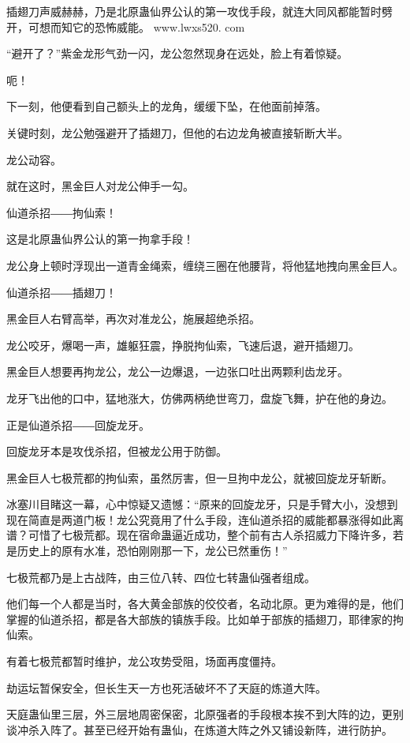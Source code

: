 
\begin{this_body}

插翅刀声威赫赫，乃是北原蛊仙界公认的第一攻伐手段，就连大同风都能暂时劈开，可想而知它的恐怖威能。 www.lwxs520. com

“避开了？”紫金龙形气劲一闪，龙公忽然现身在远处，脸上有着惊疑。

呃！

下一刻，他便看到自己额头上的龙角，缓缓下坠，在他面前掉落。

关键时刻，龙公勉强避开了插翅刀，但他的右边龙角被直接斩断大半。

龙公动容。

就在这时，黑金巨人对龙公伸手一勾。

仙道杀招――拘仙索！

这是北原蛊仙界公认的第一拘拿手段！

龙公身上顿时浮现出一道青金绳索，缠绕三圈在他腰背，将他猛地拽向黑金巨人。

仙道杀招――插翅刀！

黑金巨人右臂高举，再次对准龙公，施展超绝杀招。

龙公咬牙，爆喝一声，雄躯狂震，挣脱拘仙索，飞速后退，避开插翅刀。

黑金巨人想要再拘龙公，龙公一边爆退，一边张口吐出两颗利齿龙牙。

龙牙飞出他的口中，猛地涨大，仿佛两柄绝世弯刀，盘旋飞舞，护在他的身边。

正是仙道杀招――回旋龙牙。

回旋龙牙本是攻伐杀招，但被龙公用于防御。

黑金巨人七极荒都的拘仙索，虽然厉害，但一旦拘中龙公，就被回旋龙牙斩断。

冰塞川目睹这一幕，心中惊疑又遗憾：“原来的回旋龙牙，只是手臂大小，没想到现在简直是两道门板！龙公究竟用了什么手段，连仙道杀招的威能都暴涨得如此离谱？可惜了七极荒都。现在宿命蛊逼近成功，整个前有古人杀招威力下降许多，若是历史上的原有水准，恐怕刚刚那一下，龙公已然重伤！”

七极荒都乃是上古战阵，由三位八转、四位七转蛊仙强者组成。

他们每一个人都是当时，各大黄金部族的佼佼者，名动北原。更为难得的是，他们掌握的仙道杀招，都是各大部族的镇族手段。比如单于部族的插翅刀，耶律家的拘仙索。

有着七极荒都暂时维护，龙公攻势受阻，场面再度僵持。

劫运坛暂保安全，但长生天一方也死活破坏不了天庭的炼道大阵。

天庭蛊仙里三层，外三层地周密保密，北原强者的手段根本挨不到大阵的边，更别谈冲杀入阵了。甚至已经开始有蛊仙，在炼道大阵之外又铺设新阵，进行防护。


\end{this_body}
